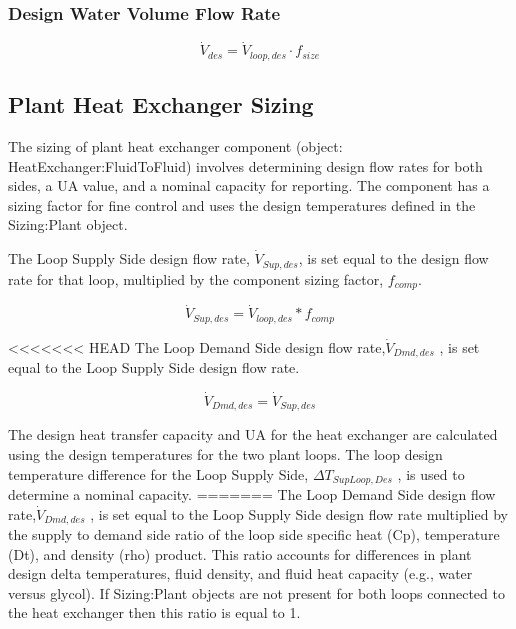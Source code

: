 \subsubsection{Design Water Volume Flow Rate}\label{design-boiler-water-flow-rate-1}

\begin{equation}
\dot V_{des} = \dot V_{loop,des} \cdot f_{size}
\end{equation}

\subsection{Plant Heat Exchanger Sizing}\label{plant-heat-exchanger-sizing}

The sizing of plant heat exchanger component (object: HeatExchanger:FluidToFluid) involves determining design flow rates for both sides, a UA value, and a nominal capacity for reporting. The component has a sizing factor for fine control and uses the design temperatures defined in the Sizing:Plant object.

The Loop Supply Side design flow rate, \({\dot V_{Sup,des}}\), is set equal to the design flow rate for that loop, multiplied by the component sizing factor, \({f_{comp}}\).

\begin{equation}
{\dot V_{Sup,des}} = {\dot V_{loop,des}}*{f_{comp}}
\end{equation}

<<<<<<< HEAD
The Loop Demand Side design flow rate,\({\dot V_{Dmd,des}}\) , is set equal to the Loop Supply Side design flow rate.

\begin{equation}
{\dot V_{Dmd,des}} = {\dot V_{Sup,des}}
\end{equation}

The design heat transfer capacity and UA for the heat exchanger are calculated using the design temperatures for the two plant loops. The loop design temperature difference for the Loop Supply Side, \(\Delta {T_{SupLoop,Des}}\) , is used to determine a nominal capacity.
=======
The Loop Demand Side design flow rate,\({\dot V_{Dmd,des}}\) , is set equal to the Loop Supply Side design flow rate multiplied by the supply to demand side ratio of the loop side specific heat (Cp), temperature (Dt), and density (rho) product. This ratio accounts for differences in plant design delta temperatures, fluid density, and fluid heat capacity (e.g., water versus glycol). If Sizing:Plant objects are not present for both loops connected to the heat exchanger then this ratio is equal to 1.

